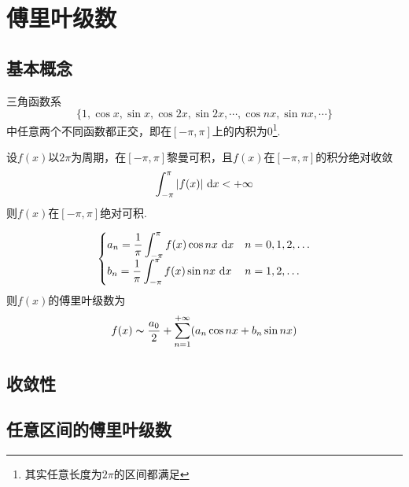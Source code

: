 
\section{傅里叶级数}
\subsection{基本概念}
\begin{theorem}[三角函数系]
三角函数系
\[\{1,\cos x,\sin x,\cos 2x,\sin 2x,\cdots,\cos nx,\sin nx,\cdots\}\]
中任意两个不同函数都正交，即在$[-\pi,\pi]$上的内积为$0$\footnote{其实任意长度为$2\pi$的区间都满足}.
\end{theorem}
\begin{definition}[绝对可积]
设$f(x)$以$2\pi$为周期，在$[-\pi,\pi]$黎曼可积，且$f(x)$在$[-\pi,\pi]$的积分绝对收敛
\[\displaystyle\int_{-\pi}^{\pi}{|f(x)|}\,\,\mathrm{d} x<+\infty\]
则$f(x)$在$[-\pi,\pi]$绝对可积.
\end{definition}
\begin{definition}[傅里叶系数]
\[\begin{cases}
a_n=\dfrac{1}{\pi}\displaystyle\int_{-\pi}^{\pi}{f(x)\cos nx}\,\,\mathrm{d} x & n=0,1,2,\ldots\\
b_n=\dfrac{1}{\pi}\displaystyle\int_{-\pi}^{\pi}{f(x)\sin nx}\,\,\mathrm{d} x & n=1,2,\ldots
\end{cases}\]
则$f(x)$的傅里叶级数为
\[f(x)\thicksim\dfrac{a_0}{2}+\sum_{n=1}^{+\infty}(a_n\cos nx+b_n\sin nx)\]
\end{definition}

\subsection{收敛性}

\subsection{任意区间的傅里叶级数}